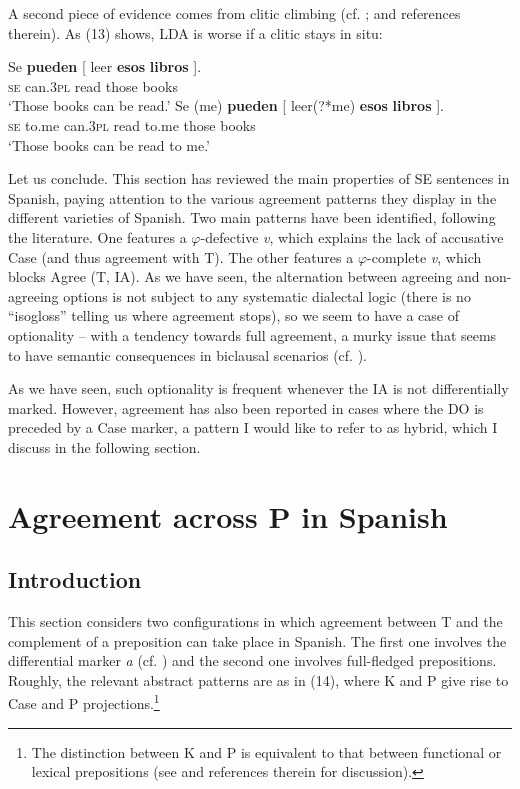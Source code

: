 \documentclass[output=paper]{langsci/langscibook}
\begin{document}
A second piece of evidence comes from clitic climbing (cf. \citealt{Gallego2016,Paradís2016}; and references therein). As (13) shows, LDA is worse if a clitic stays in situ:

\ea%
    \label{ex:gallego:13}
    \ea
    \gll Se  \textbf{pueden}  [ leer   \textbf{esos}    \textbf{libros} ].\\
         \textsc{se} can\textsc{{}.3pl} {}  read  those  books\\
    \glt ‘Those books can be read.’
    \ex
    \gll Se   (me)      \textbf{pueden}  [ leer(?*me)    \textbf{esos}    \textbf{libros} ].\\
         \textsc{se} to.me  can\textsc{{}.3pl} {}   {read   to.me}  those  books\\
    \glt ‘Those books can be read to me.’
    \z
\z

Let us conclude. This section has reviewed the main properties of SE sentences in Spanish, paying attention to the various agreement patterns they display in the different varieties of Spanish. Two main patterns have been identified, following the literature. One features a $\varphi $-defective \textit{v}, which explains the lack of accusative Case (and thus agreement with T). The other features a $\varphi $-complete \textit{v}, which blocks Agree (T, IA). As we have seen, the alternation between agreeing and non-agreeing options is not subject to any systematic dialectal logic (there is no “isogloss” telling us where agreement stops), so we seem to have a case of optionality – with a tendency towards full agreement, a murky issue that seems to have semantic consequences in biclausal scenarios (cf. \citealt{Martin1998,Fernández-Serrano2016}). 

As we have seen, such optionality is frequent whenever the IA is not differentially marked. However, agreement has also been reported in cases where the DO is preceded by a Case marker, a pattern I would like to refer to as hybrid, which I discuss in the following section.

\section{Agreement across P in Spanish} %
\subsection{Introduction}%

This section considers two configurations in which agreement between T and the complement of a preposition can take place in Spanish. The first one involves the differential marker \textit{a} (cf. \citealt{Torrego1998,López2012}) and the second one involves full-fledged prepositions. Roughly, the relevant abstract patterns are as in (14), where K and P give rise to Case and P projections.\footnote{The distinction between K and P is equivalent to that between functional or lexical prepositions (see \citealt{Riemsdijk1990} and references therein for discussion).}
\end{document}
